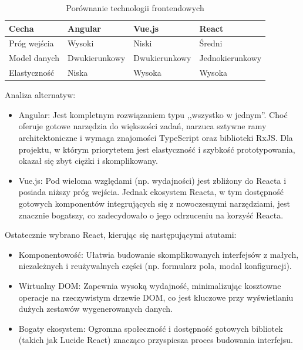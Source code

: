 \begin{table}[H]
    \centering
    \begin{tabular}{|l|l|l|l|}
        \hline
        \textbf{Cecha} & \textbf{Angular} & \textbf{Vue.js} & \textbf{React}  \\
        \hline
        Próg wejścia   & Wysoki           & Niski           & Średni          \\
        \hline
        Model danych   & Dwukierunkowy    & Dwukierunkowy   & Jednokierunkowy \\
        \hline
        Elastyczność   & Niska            & Wysoka          & Wysoka          \\
        \hline
    \end{tabular}
    \caption{Porównanie technologii frontendowych}
    \label{tab:frontend_comparison}
\end{table}

Analiza alternatyw:
\begin{itemize}
    \item Angular: Jest kompletnym rozwiązaniem typu ,,wszystko w jednym''. Choć oferuje gotowe narzędzia do większości zadań, narzuca sztywne ramy architektoniczne i wymaga znajomości TypeScript oraz biblioteki RxJS. Dla projektu, w którym priorytetem jest elastyczność i szybkość prototypowania, okazał się zbyt ciężki i skomplikowany.
    \item Vue.js: Pod wieloma względami (np. wydajności) jest zbliżony do Reacta i posiada niższy próg wejścia. Jednak ekosystem Reacta, w tym dostępność gotowych komponentów integrujących się z nowoczesnymi narzędziami, jest znacznie bogatszy, co zadecydowało o jego odrzuceniu na korzyść Reacta.
\end{itemize}

Ostatecznie wybrano React, kierując się następującymi atutami:
\begin{itemize}
    \item Komponentowość: Ułatwia budowanie skomplikowanych interfejsów z małych, niezależnych i reużywalnych części (np. formularz pola, modal konfiguracji).
    \item Wirtualny \gls{DOM}: Zapewnia wysoką wydajność, minimalizując kosztowne operacje na rzeczywistym drzewie DOM, co jest kluczowe przy wyświetlaniu dużych zestawów wygenerowanych danych.
    \item Bogaty ekosystem: Ogromna społeczność i dostępność gotowych bibliotek (takich jak Lucide React) znacząco przyspiesza proces budowania interfejsu.
\end{itemize}

